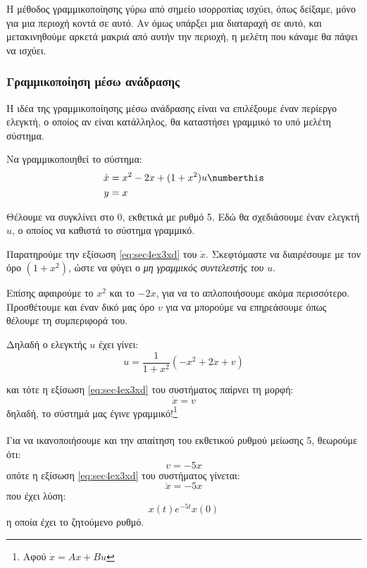 \documentclass[11pt,a4paper,notitlepage,fleqn]{article}
\begin{document}
Η μέθοδος γραμμικοποίησης γύρω από σημείο ισορροπίας ισχύει, όπως δείξαμε,
μόνο για μια περιοχή κοντά σε αυτό. Αν όμως υπάρξει μια διαταραχή σε αυτό,
και μετακινηθούμε αρκετά μακριά από αυτήν την περιοχή, η μελέτη
που κάναμε θα πάψει να ισχύει.

\subsubsection{Γραμμικοποίηση μέσω ανάδρασης}
Η ιδέα της γραμμικοποίησης μέσω ανάδρασης είναι να επιλέξουμε έναν
περίεργο ελεγκτή, ο οποίος αν είναι κατάλληλος, θα καταστήσει γραμμικό
το υπό μελέτη σύστημα.

\begin{exercise}[Παράδειγμα]
	\label{sec4ex3}
	Να γραμμικοποιηθεί το σύστημα:
	\begin{align*}
		\dot x &= x^2 -2x + (1+x^2)u \numberthis
		\label{eq:sec4ex3xd}
		\\
		y &= x
	\end{align*}

	Θέλουμε να συγκλίνει στο 0, εκθετικά με ρυθμό 5.
	\tcblower
	Εδώ θα σχεδιάσουμε έναν ελεγκτή \( u \), ο οποίος να καθιστά το σύστημα
	γραμμικό.

	Παρατηρούμε την εξίσωση \eqref{eq:sec4ex3xd} του \( \dot x \). Σκεφτόμαστε να διαιρέσουμε με τον όρο \( (1+x^2) \), ώστε να
	φύγει ο \textit{μη γραμμικός συντελεστής του \( u \)}.

	Επίσης αφαιρούμε το \( x^2 \) και το \( -2x \), για να το απλοποιήσουμε
	ακόμα περισσότερο. Προσθέτουμε και έναν δικό μας όρο \( v \) για να μπορούμε
	να επηρεάσουμε όπως θέλουμε τη συμπεριφορά του.

	Δηλαδή ο ελεγκτής \( u \) έχει γίνει:
	\[
	u = \frac{1}{1+x^2} \left( -x^2+2x+v \right)
	\]

	και τότε η εξίσωση \eqref{eq:sec4ex3xd} του συστήματος παίρνει τη
	μορφή:
	\[
	\dot x = v
	\]
	δηλαδή, το σύστημά μας έγινε γραμμικό!\footnote{Αφού \( \dot x = Ax+Bu \)}

	\paragraph{}
	Για να ικανοποιήσουμε και την απαίτηση του εκθετικού ρυθμού μείωσης
	5, θεωρούμε ότι:
	\[
	v = -5x
	\]
	οπότε η εξίσωση \eqref{eq:sec4ex3xd} του συστήματος γίνεται:
	\[
	\dot x = -5x
	\]
	που έχει λύση:
	\[
	x(t) e^{-5t} x(0)
	\]
	η οποία έχει το ζητούμενο ρυθμό.
\end{exercise}
\end{document}
